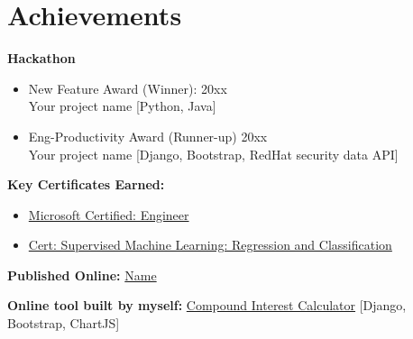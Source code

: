 \documentclass[letterpaper, 10pt]{article}
\newcommand{\secStartSpace}{\vspace{3pt}}
\begin{document}
\section{\texorpdfstring{\color{blue} \textbf{Achievements}}{Achievements}}
\secStartSpace

\hypersetup{
    linkcolor=HeaderColor,
    filecolor=HeaderColor,
    urlcolor=TextColor,
}

\begin{addmargin}[0.5em]{1em}
        \large\textbf{Hackathon}\hfill
    \begin{itemize}
        \item New Feature Award (Winner): \hfill 20xx \\
        Your project name [Python, Java]
        \item Eng-Productivity Award (Runner-up) \hfill 20xx \\
        Your project name [Django, Bootstrap, RedHat security data API]
    \end{itemize}
\end{addmargin}

\begin{addmargin}[0.5em]{1em}
	\large\textbf{Key Certificates Earned:}\hfill
    \begin{itemize}[itemsep=-2.25pt, leftmargin=1.5em]
        \item \href{https://learn.microsoft.com/en-us/users/Black-Myth/}{Microsoft Certified: Engineer} \hfill 
        \item \href{https://www.coursera.org/account/accomplishments/verify/}{Cert: Supervised Machine Learning: Regression and Classification} \hfill
    \end{itemize}
\end{addmargin}

\begin{addmargin}[0.5em]{1em}
    \large\textbf{Published Online:} \href{https://www.vim.org/scripts/script.php}{Name}
\end{addmargin}

\begin{addmargin}[0.5em]{1em}
    \large\textbf{Online tool built by myself:} \href{https://www.quickcompoundinterestcalculator.com/}{ Compound Interest Calculator} [Django, Bootstrap, ChartJS]
\end{addmargin}


\end{document}
